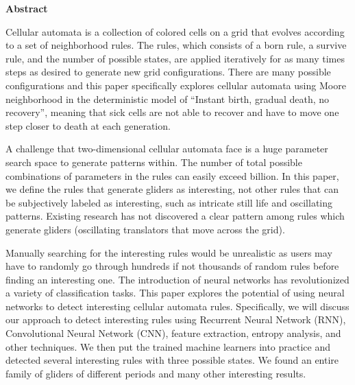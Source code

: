 \documentclass[12pt]{article}
\numberwithin{figure}{section} %
\begin{document}
\thispagestyle{plain}
\begin{center}
\Large
\textbf{Abstract}
\end{center}
Cellular automata is a collection of colored cells on a grid that evolves according to a set of neighborhood rules. The rules, which consists of a born rule, a survive rule, and the number of possible states, are applied iteratively for as many times steps as desired to generate new grid configurations. There are many possible configurations and this paper specifically explores cellular automata using Moore neighborhood in the deterministic model of “Instant birth, gradual death, no recovery”, meaning that sick cells are not able to recover and have to move one step closer to death at each generation. 

A challenge that two-dimensional cellular automata face is a huge parameter search space to generate patterns within. The number of total possible combinations of parameters in the rules can easily exceed billion. In this paper, we define the rules that generate gliders as interesting, not other rules that can be subjectively labeled as interesting, such as intricate still life and oscillating patterns. Existing research has not discovered a clear pattern among rules which generate gliders (oscillating translators that move across the grid). 

Manually searching for the interesting rules would be unrealistic as users may have to randomly go through hundreds if not thousands of random rules before finding an interesting one. The introduction of neural networks has revolutionized a variety of classification tasks. This paper explores the potential of using neural networks to detect interesting cellular automata rules. Specifically, we will discuss our approach to detect interesting rules using Recurrent Neural Network (RNN), Convolutional Neural Network (CNN), feature extraction, entropy analysis, and other techniques. We then put the trained machine learners into practice and detected several interesting rules with three possible states. We found an entire family of gliders of different periods and many other interesting results. 
\end{document}
